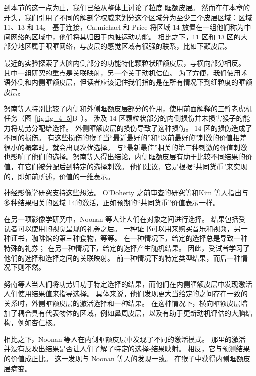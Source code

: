到本节的这一点为止，我们已经从整体上讨论了粒度 眶额皮层。
然而在在本章的开头，我们引用了不同的解剖学权威来划分这个区域分为至少三个皮层区域：区域 11、13 和 14。
基于连接，Carmichael 和 Price 将区域 14 放置在一组他们称为中间网络的区域中，他们将其归因于内脏运动功能。
相比之下，11 区和 13 区的大部分地区属于眼眶网络，与皮层的感觉区域有很强的联系，比如下颞皮层。\par


最近的实验探索了大脑内侧部分的功能特化颗粒状眶额皮层，与横向部分相反。
其中一组研究的重点是关联映射，另一个关于动机估值。
为了方便，我们使用术语外侧和内侧眶额皮层，但读者应该记住我们指的是在所有情况下到细粒度的眶额皮层。\par


努南等人\cite{noonan2010separate}特别比较了内侧和外侧眶额皮层部分的作用，使用前面解释的三臂老虎机任务（图~\ref{fig:fig_4_5}B~）。
涉及 14 区颗粒状部分的内侧损伤并未损害猴子的能力将功劳分配给选择。
外侧眶额皮层的损伤导致了这种损伤。
14 区的损伤造成了不同的损伤。
有这些损伤的猴子当“最近最好的”和“以前最好的”刺激的价值相差很小的概率时，就会出现次优选择。
与“最新最佳”相关的第三种刺激的价值刺激也影响了他们的选择。努南等人得出结论，内侧眶额皮层有助于比较不同结果的价值，在它们被分配后到特定的选择刺激。
他们建议，它是根据“共同货币”来实现的，即如前所述，价值的一维表示。\par


神经影像学研究支持这些想法。
O'Doherty\cite{o2001abstract} 之前审查的研究等和Kim 等人\cite{kim2011overlapping}指出与多种结果相关的区域 14的激活，正如预期的“共同货币”价值表示一样。\par


在另一项影像学研究中，Noonan 等人\cite{noonan2011distinct}让人们在对象之间进行选择。
结果包括受试者可以使用的视觉呈现的礼券之后。
一种证书可以用来购买音乐和视频，另一种证书，咖啡馆的第三种食物，等等。
在一种情况下，给定的选择总是导致一种特殊的礼券； 在另一种情况下，给定的选择产生随机结果。
因此，受试者学习了他们的选择和选择之间的关联映射。
前一种情况下的特定类型结果，而后一种情况下则不然。\par


努南等人当人们将功劳归功于特定选择的结果，而他们在内侧眶额皮层中发现激活人们使用结果值来指导选择。
具体来说，他们发现更大当给定的之间存在一致的关系时，外侧眶额皮层的激活选择和一种结果。
在这种情况下，横向眶额皮层增加了耦合具有代表物体的区域，例如鼻周皮层，以及有助于更新动机评估的大脑结构，例如杏仁核。\par


相比之下，Noonan 等人在内侧眶额皮层中发现了不同的激活模式。
那里的激活并没有反映出结果是否让人们了解了特定的选择-结果映射。
相反，它与预测结果的价值成正比。
这一发现与 Noonan 等人的发现一致\cite{noonan2010separate}。
在猴子中获得内侧眶额皮层病变。\par


